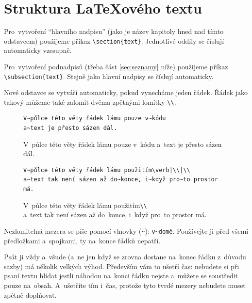 \clearpage
\section[Struktura LaTeXového ]{Struktura \LaTeX{}ového textu}

Pro~vytvoření \enquote{hlavního nadpisu} (jako je název kapitoly hned nad tímto odstavcem) použijeme příkaz \verb|\section{text}|.
Jednotlivé oddíly se číslují automaticky vzesupně.

Pro~vytvoření podnadpisů (třeba část \ref{sec:seznamy} níže) použijeme příkaz  \verb|\subsection{text}|.
Stejně jako hlavní nadpisy se číslují automaticky.

Nové odstavce se vytváří automaticky, pokud vynecháme jeden řádek.
Řádek jako takový můžeme také zalomit dvěma zpětnými lomítky \verb|\\|.

\begin{figure}[ht]
\onehalfspacing
\begin{mdframed}
\begin{verbatim}
V~půlce této věty řádek lámu pouze v~kódu
a~text je přesto sázen dál.
\end{verbatim}

V~půlce této věty řádek lámu pouze v~kódu
a~text je přesto sázen dál.

\begin{verbatim}
V~půlce této věty řádek lámu použitím\verb|\\|\\
a~text tak není sázen až do~konce, i~když pro~to prostor má.
\end{verbatim}

V~půlce této věty řádek lámu použitím\verb|\\|\\
a~text tak není sázen až do~konce, i~když pro~to prostor má.
\end{mdframed}
\end{figure}

Nezlomitelná mezera se píše pomocí vlnovky (\texttt{\~}): \verb|v~domě|.
Používejte ji před všemi předložkami a~spojkami, ty na~konce řádků nepatří.

Psát ji vždy a~všude (a~ne jen když se zrovna dostane na~konec řádku z~důvodu sazby) má několik velkých výhod.
Především vám to ušetří čas: nebudete si při psaní textu hlídat jestli náhodou na~konci řádku nejste a~můžete se soustředit pouze na~obsah.
A~ušetříte tím i~čas, protože tyto tvrdé mezery nebudete muset zpětně doplňovat.

